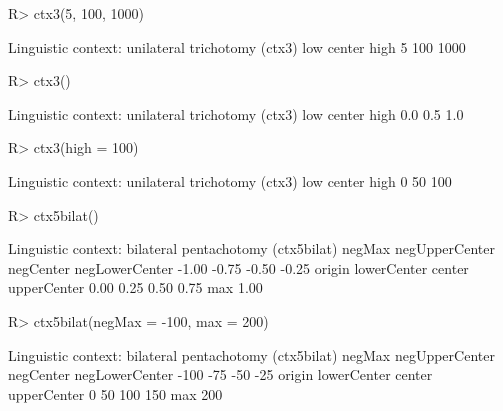 \begin{Schunk}
% --begin: "ctx"
\begin{Sinput}
R> ctx3(5, 100, 1000)
\end{Sinput}
\begin{Soutput}
Linguistic context: unilateral trichotomy (ctx3)
   low center   high 
     5    100   1000 
\end{Soutput}
\begin{Sinput}
R> ctx3()
\end{Sinput}
\begin{Soutput}
Linguistic context: unilateral trichotomy (ctx3)
   low center   high 
   0.0    0.5    1.0 
\end{Soutput}
\begin{Sinput}
R> ctx3(high = 100)
\end{Sinput}
\begin{Soutput}
Linguistic context: unilateral trichotomy (ctx3)
   low center   high 
     0     50    100 
\end{Soutput}
\begin{Sinput}
R> ctx5bilat()
\end{Sinput}
\begin{Soutput}
Linguistic context: bilateral pentachotomy (ctx5bilat)
        negMax negUpperCenter      negCenter negLowerCenter 
         -1.00          -0.75          -0.50          -0.25 
        origin    lowerCenter         center    upperCenter 
          0.00           0.25           0.50           0.75 
           max 
          1.00 
\end{Soutput}
\begin{Sinput}
R> ctx5bilat(negMax = -100, max = 200)
\end{Sinput}
\begin{Soutput}
Linguistic context: bilateral pentachotomy (ctx5bilat)
        negMax negUpperCenter      negCenter negLowerCenter 
          -100            -75            -50            -25 
        origin    lowerCenter         center    upperCenter 
             0             50            100            150 
           max 
           200 
\end{Soutput}
%
% --end: "ctx"
\end{Schunk}
